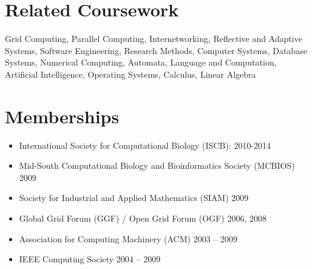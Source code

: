 \documentclass{article}
\begin{document}
%
%

\vspace{\parskip}
\section{Related Coursework}
Grid Computing, Parallel Computing, Internetworking, Reflective and Adaptive Systems, Software Engineering, Research Methods, Computer Systems, Database Systems, Numerical Computing, Automata, Language and Computation, Artificial Intelligence, Operating Systems, Calculus, Linear Algebra

%
%

\vspace{\parskip}
\section{Memberships}
\begin{itemize}
    \item International Society for Computational Biology (ISCB): 2010-2014
\end{itemize}

\begin{itemize}
    \item Mid-South Computational Biology and Bioinformatics Society (MCBIOS)		2009
\end{itemize}

\begin{itemize}
    \item Society for Industrial and Applied Mathematics (SIAM)				2009
\end{itemize}

\begin{itemize}
    \item Global Grid Forum (GGF) / Open Grid Forum (OGF)					2006, 2008
\end{itemize}

\begin{itemize}
    \item Association for Computing Machinery (ACM)					2003 – 2009
\end{itemize}

\begin{itemize}
    \item IEEE Computing Society								2004 – 2009
\end{itemize}

\end{document}
